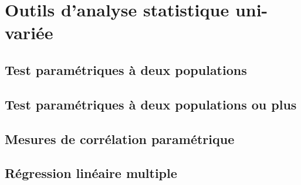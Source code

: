 \chapter{Outils d'analyse statistique uni-variée}
\label{app:statuni}


\section{Test paramétriques à deux populations}
\label{app:student}

\section{Test paramétriques à deux populations ou plus}
\label{app:anova}



\section{Mesures de corrélation paramétrique}
\label{app:corr}

\section{Régression linéaire multiple}
\label{app:regressionMultiple}
